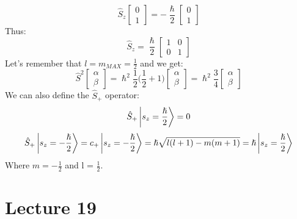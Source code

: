 \documentclass{article}
\begin{document}
$$\hat{S}_z \begin{bmatrix} 0 \\ 1 \end{bmatrix} = -\frac{\hslash}{2} \begin{bmatrix} 0 \\ 1 \end{bmatrix}$$
Thus:
$$\hat{S}_z = \frac{\hslash}{2} \begin{bmatrix}1 & 0 \\0 & 1 \end{bmatrix}
$$
Let's remember that $l = m_{MAX} = \frac{1}{2}$ and  we get:
$$\hat{S}^2  \begin{bmatrix} \alpha \\ \beta \end{bmatrix} = \hslash^2 \frac{1}{2} \biggl( \frac{1}{2} + 1 \biggl)   \begin{bmatrix} \alpha \\ \beta \end{bmatrix}  = \hslash^2 \frac{3}{4}  \begin{bmatrix} \alpha \\ \beta \end{bmatrix}$$
We can also define the $\hat{S}_+$ operator:
$$\hat{S}_+ \ket{s_z = \frac{\hslash}{2}} = 0$$
$$\hat{S}_+ \ket{ s_z = -\frac{\hslash}{2}} = c_+ \ket{s_z = -\frac{\hslash}{2}} = \hslash \sqrt{l(l+1)-m(m+1)} = \hslash \ket{s_z = \frac{\hslash}{2}}$$
Where  $m= -\frac{1}{2}$ and l = $\frac{1}{2}$.

\section{Lecture 19}
\end{document}
